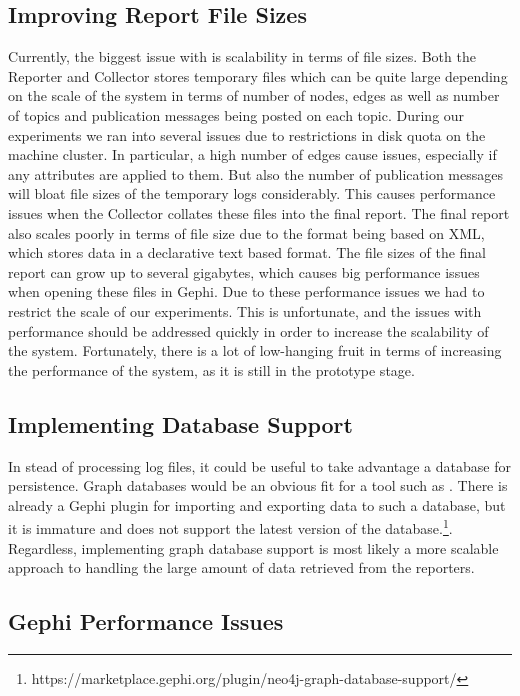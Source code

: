 \subsection{Improving Report File Sizes}

Currently, the biggest issue with \demo{} is scalability in terms of
file sizes. Both the Reporter and Collector stores temporary files
which can be quite large depending on the scale of the system in terms
of number of nodes, edges as well as number of topics and publication
messages being posted on each topic. During our experiments we ran into
several issues due to restrictions in disk quota on the machine cluster.
In particular, a high number of edges cause issues, especially if any
attributes are applied to them. But also the number of publication
messages will bloat file sizes of the temporary logs considerably. This
causes performance issues when the Collector collates these files into
the final report. The final report also scales poorly in terms of file
size due to the \gexf{} format being based on XML, which stores data in
a declarative text based format. The file sizes of the final report can
grow up to several gigabytes, which causes big performance issues when
opening these files in Gephi. Due to these performance issues we had to
restrict the scale of our experiments. This is unfortunate, and the
issues with performance should be addressed quickly in order to increase
the scalability of the system. Fortunately, there is a lot of
low-hanging fruit in terms of increasing the performance of the system,
as it is still in the prototype stage.

\subsection{Implementing Database Support}

In stead of processing log files, it could be useful to take advantage a
database for persistence. Graph databases would be an obvious fit for a
tool such as \demo{}. There is already a Gephi plugin for importing and
exporting data to such a database, but it is immature and does not
support the latest version of the
database.\footnote{https://marketplace.gephi.org/plugin/neo4j-graph-database-support/}.
Regardless, implementing graph database support is most likely a more
scalable approach to handling the large amount of data retrieved from
the reporters.

\subsection{Gephi Performance Issues}

